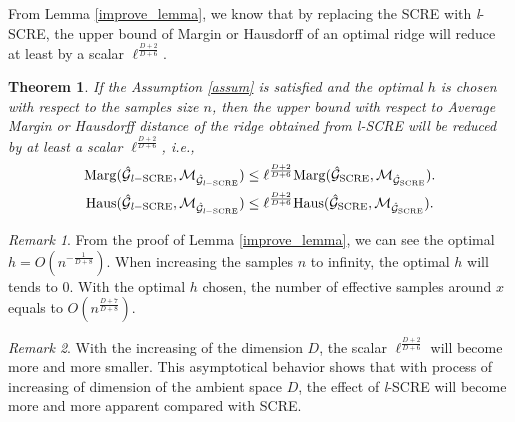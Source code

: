 \documentclass[aos,preprint]{imsart}
\newtheorem{theorem}{Theorem}[section]
\theoremstyle{remark}
\newtheorem*{remark}{Remark}
\begin{document}
From Lemma \ref{improve_lemma}, we know that by replacing the SCRE with {\it l}-SCRE, the upper bound of Margin or Hausdorff  of an optimal ridge will reduce at least by a scalar $\ell^{\frac{D+2}{D+6}}$.
\begin{theorem} If the Assumption \ref{assum} is satisfied and the optimal $h$ is chosen with respect to the samples size $n$, %
then the upper bound with respect to Average Margin or Hausdorff distance of the ridge obtained from {\it l}-SCRE will be reduced by at least a scalar $\ell^{\frac{D+2}{D+6}}$,  i.e., 
\begin{gather*}
{\rm Marg}(\hat{\cal G}_{{\it l-}{\rm SCRE}}, {\cal M}_{\hat{\cal G}_{{\it l}-{\rm SCRE}}}) \leq \ell^{\frac{D+2}{D+6}} {\rm Marg}(\hat{\cal G}_{\rm SCRE}, {\cal M}_{\hat{\cal G}_{\rm SCRE}}).\\
{\rm Haus}(\hat{\cal G}_{{\it l-}{\rm SCRE}}, {\cal M}_{\hat{\cal G}_{{\it l}-{\rm SCRE}}}) \leq \ell^{\frac{D+2}{D+6}} {\rm Haus}(\hat{\cal G}_{\rm SCRE}, {\cal M}_{\hat{\cal G}_{\rm SCRE}}).
\end{gather*}
\end{theorem}
\begin{remark}
From the proof of Lemma \ref{improve_lemma}, we can see the optimal $h=O(n^{-\frac{1}{D+8}})$.  When increasing the samples $n$ to infinity, the optimal $h$ will tends to 0. With the optimal $h$ chosen, the number of effective samples around $x$ equals to $O(n^\frac{D+7}{D+8})$.
\end{remark}
\begin{remark}
With the increasing of the dimension $D$, the scalar $\ell^{\frac{D+2}{D+6}}$ will become more and more smaller. This asymptotical behavior shows that with process of increasing of dimension of the ambient space $D$, the effect of {\it l}-SCRE will become more and more apparent compared with SCRE.
\end{remark}
\end{document}
